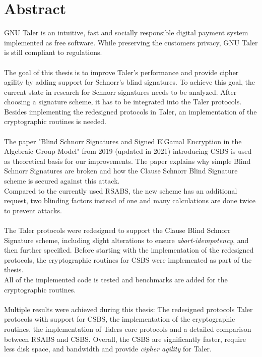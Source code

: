 \chapter*{Abstract}
GNU Taler is an intuitive, fast and socially responsible digital payment system implemented as free software.
While preserving the customers privacy, GNU Taler is still compliant to regulations.
\\\\
The goal of this thesis is to improve Taler's performance and provide cipher agility by adding support for Schnorr's blind signatures.
To achieve this goal, the current state in research for Schnorr signatures needs to be analyzed.
After choosing a signature scheme, it has to be integrated into the Taler protocols.
Besides implementing the redesigned protocols in Taler, an implementation of the cryptographic routines is needed.
\\\\
The paper "Blind Schnorr
Signatures and Signed ElGamal Encryption in the Algebraic Group Model" \cite{cryptoeprint:2019:877} from 2019 (updated in 2021) introducing \gls{CSBS} is used as theoretical basis for our improvements.
The paper explains why simple Blind Schnorr Signatures are broken and how the Clause Schnorr Blind Signature scheme is secured against this attack.\\
Compared to the currently used \gls{RSABS}, the new scheme has an additional request, two blinding factors instead of one and many calculations are done twice to prevent attacks.
\\\\
The Taler protocols were redesigned to support the Clause Blind Schnorr Signature scheme, including slight alterations to ensure \textit{abort-idempotency}, and then further specified.
Before starting with the implementation of the redesigned protocols, the cryptographic routines for \gls{CSBS} were implemented as part of the thesis. \\
All of the implemented code is tested and benchmarks are added for the cryptographic routines.
\\\\
Multiple results were achieved during this thesis:
The redesigned protocols Taler protocols with support for \gls{CSBS}, the implementation of the cryptographic routines, the implementation of Talers core protocols and a detailed comparison between \gls{RSABS} and \gls{CSBS}.
Overall, the \gls{CSBS} are significantly faster, require less disk space, and bandwidth and provide \textit{cipher agility} for Taler.

